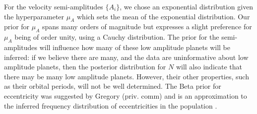 \documentclass[useAMS,usenatbib]{mn2e}
\begin{document}
For the velocity semi-amplitudes $\{A_i\}$, we chose an exponential distribution
given the hyperparameter $\mu_A$ which sets the mean of the exponential distribution.
Our prior for $\mu_A$ spans many orders of
magnitude but expresses a slight preference for $\mu_A$ being of order unity,
using a Cauchy distribution. The prior for the semi-amplitudes
will influence how many of these low amplitude planets will be inferred: if we
believe there are many, and the data are uninformative about low amplitude
planets, then the posterior distribution for $N$ will also indicate that there
may be many low amplitude planets. However, their other properties, such as
their orbital periods, will not be well determined. The Beta prior for
eccentricity was suggested by Gregory (priv. comm) and is an approximation
to the inferred frequency distribution of eccentricities in the population
\citep{kipping}.
\end{document}
